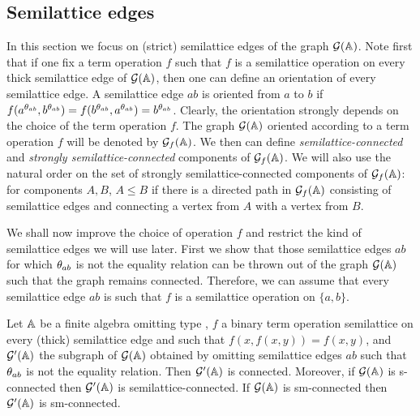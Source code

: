 \documentclass[11pt]{article}
\begin{document}
\subsection{Semilattice edges}\label{sec:thin-semilattice}

In this section we focus on (strict) semilattice edges of the graph ${\mathcal G}({\mathbb A})$. Note
first that if one fix a term operation $f$ such that $f$ is a semilattice
operation on every thick semilattice edge of ${\mathcal G}({\mathbb A})$, then one can define
an orientation of every semilattice edge. A semilattice edge $ab$ is oriented from $a$ 
to $b$ if $f(a^{\theta_{ab}},b^{\theta_{ab}})=f(b^{\theta_{ab}},
a^{\theta_{ab}})=b^{\theta_{ab}}$. 
Clearly, the orientation strongly depends on 
the choice of the term operation $f$. The graph ${\mathcal G}({\mathbb A})$ oriented
according to a term operation $f$ will be denoted by ${\mathcal G}_f({\mathbb A})$. We
then can define {\em semilattice-connected} and {\em strongly semilattice-connected}
components of ${\mathcal G}_f({\mathbb A})$. We will also use the natural order on the
set of strongly semilattice-connected components of ${\mathcal G}_f({\mathbb A})$: for
components $A,B$, $A\le B$ if there is a directed path in ${\mathcal G}_f({\mathbb A})$
consisting of semilattice edges and connecting a vertex from $A$ with a vertex
from $B$. 

We shall now improve the choice of operation $f$ and restrict the kind of
semilattice edges we will use later.
First we show that those semilattice edges $ab$ for which $\theta_{ab}$ is not
the equality relation can be thrown out of the graph ${\mathcal G}({\mathbb A})$ such that
the graph remains connected. Therefore, we can assume that every semilattice
edge $ab$ is such that $f$ is a semilattice operation on $\{a,b\}$. 
 
\begin{prop}\label{pro:thin-thick}
Let ${\mathbb A}$ be a finite algebra omitting type \one, $f$ a binary term operation 
semilattice on every (thick) semilattice edge and such that $f(x,f(x,y))=f(x,y)$, 
and ${\mathcal G}'({\mathbb A})$ the subgraph of ${\mathcal G}({\mathbb A})$ obtained by omitting semilattice 
edges $ab$ such that $\theta_{ab}$ is not the equality relation. Then ${\mathcal G}'({\mathbb A})$ 
is connected. Moreover, if ${\mathcal G}({\mathbb A})$ is s-connected then ${\mathcal G}'({\mathbb A})$ 
is semilattice-connected. If ${\mathcal G}({\mathbb A})$ is sm-connected then ${\mathcal G}'({\mathbb A})$ is
sm-connected. 
\end{prop}
\end{document}
